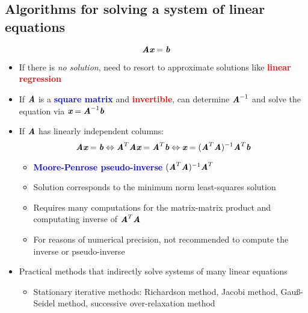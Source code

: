 \documentclass[12pt]{article}
\theoremstyle{definition}
\newcommand{\keyword}[1]{\textbf{\textcolor{red}{#1}}}
\newcommand{\subkeyword}[1]{\textbf{\textcolor{blue}{#1}}}
\newcommand{\mat}[1]{\textit{\textbf{#1}}}
\newcommand{\inverse}[1]{\textit{\textbf{#1}}^{-1}}
\newcommand{\transpose}[1]{\textit{\textbf{#1}}^{T}}
\begin{document}
        \subsection{Algorithms for solving a system of linear equations}
            \begin{equation*}
                \mat{A}\mat{x}=\mat{b}
            \end{equation*}
            \begin{itemize}
                \item If there is \textit{no solution}, need to resort to approximate 
                    solutions like \keyword{linear regression}
                \item If $\mat{A}$ is a \subkeyword{square matrix} and 
                    \keyword{invertible}, can determine $\inverse{A}$ and solve 
                    the equation via $\mat{x}=\inverse{A}\mat{b}$
                \item If $\mat{A}$ has linearly independent columns:
                    \begin{equation*}
                        \mat{A}\mat{x}=\mat{b}\Leftrightarrow
                        \transpose{A}\mat{A}\mat{x}=\transpose{A}\mat{b}\Leftrightarrow
                        \mat{x}=(\transpose{A}\mat{A})^{-1}\transpose{A}\mat{b}
                    \end{equation*}
                    \begin{itemize}
                        \item \subkeyword{Moore-Penrose pseudo-inverse} $(\transpose{A}\mat{A})^{-1}\transpose{A}$
                        \item Solution corresponds to the minimum norm least-squares solution
                        \item Requires many computations for the matrix-matrix 
                            product and computating inverse of $\transpose{A}\mat{A}$
                        \item For reasons of numerical precision, not recommended 
                            to compute the inverse or pseudo-inverse 
                    \end{itemize}
                \item Practical methods that indirectly solve systems of many linear equations
                    \begin{itemize}
                        \item Stationary iterative methods: Richardson  method, Jacobi method, Gauß-Seidel method, successive over-relaxation method 

\end{itemize}
\end{itemize}
\end{document}
